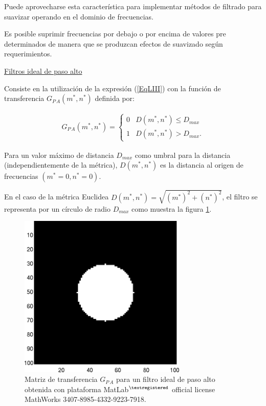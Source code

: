 Puede aprovecharse esta caracter\'istica para implementar m\'etodos de filtrado para suavizar operando en el dominio de frecuencias.
%

%
Es posible suprimir frecuencias por debajo o por encima de valores pre determinados de manera que se produzcan efectos de suavizado seg\'un requerimientos.
%

\begin{center}
\underline{Filtros ideal de paso alto}
\end{center}

Consiste en la utilizaci\'on de la expresi\'on (\ref{EqLIII}) con la funci\'on de transferencia $G_{P\,A}(m^*, n^*)$ definida por:

\begin{eqnarray}
	G_{P\,A}(m^*, n^*) = \left\{ \begin{array}{ll}
	0 & \mbox{$D(m^*, n^*) \leq D_{max}$}\\
	1 & \mbox{$D(m^*, n^*) > D_{max}$}.\end{array} \right.
\label{EqLXVII}
\end{eqnarray}

Para un valor m\'aximo de distancia $D_{max}$ como umbral para la distancia (independientemente de la m\'etrica), $D(m^*, n^*)$ es la distancia al
origen de frecuencias $(m^* = 0, n^* = 0)$.
%

%
En el caso de la m\'etrica Euclidea $D(m^*, n^*) = \sqrt{ (m^*)^2 + (n^*)^2}$, el filtro se representa por un c\'irculo de radio $D_{max}$ como
muestra la figura \ref{Fig2_8}.

\vspace{1.0cm}

\begin{center}
\begin{figure} [!h]

\centering
\includegraphics[width=8cm]{figures/Fig2_8.png}

\caption{Matriz de transferencia $G_{P\,A}$ para un filtro ideal de paso alto
         obtenida con plataforma MatLab$^{\textregistered}$ official license MathWorks 3407-8985-4332-9223-7918.}
\label{Fig2_8}

\end{figure}
\end{center}

